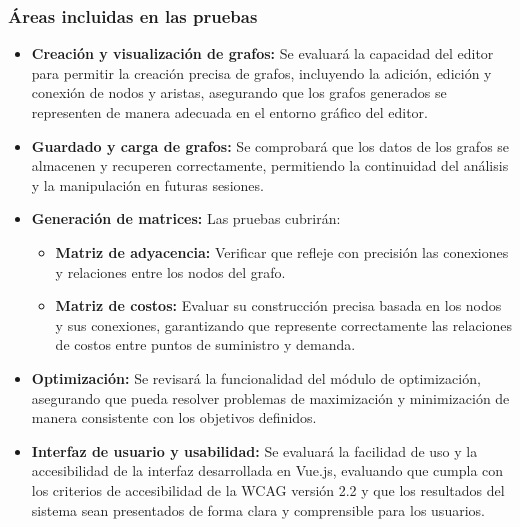 \documentclass[stu, 12pt, letterpaper, donotrepeattitle, floatsintext, natbib]{apa7}
\begin{document}
\subsubsection{Áreas incluidas en las pruebas}

\begin{itemize}
    \item \textbf{Creación y visualización de grafos:} Se evaluará la capacidad del editor para permitir la creación precisa de grafos, incluyendo la adición, edición y conexión de nodos y aristas, asegurando que los grafos generados se representen de manera adecuada en el entorno gráfico del editor.
    
    \item \textbf{Guardado y carga de grafos:} Se comprobará que los datos de los grafos se almacenen y recuperen correctamente, permitiendo la continuidad del análisis y la manipulación en futuras sesiones.

    \item \textbf{Generación de matrices:} Las pruebas cubrirán:
    \begin{itemize}
        \item \textbf{Matriz de adyacencia:} Verificar que refleje con precisión las conexiones y relaciones entre los nodos del grafo.
        \item \textbf{Matriz de costos:} Evaluar su construcción precisa basada en los nodos y sus conexiones, garantizando que represente correctamente las relaciones de costos entre puntos de suministro y demanda.
    \end{itemize}

    \item \textbf{Optimización:} Se revisará la funcionalidad del módulo de optimización, asegurando que pueda resolver problemas de maximización y minimización de manera consistente con los objetivos definidos.

    \item \textbf{Interfaz de usuario y usabilidad:} Se evaluará la facilidad de uso y la accesibilidad de la interfaz desarrollada en Vue.js, evaluando que cumpla con los criterios de accesibilidad de la WCAG versión 2.2 y que los resultados del sistema sean presentados de forma clara y comprensible para los usuarios.


\end{itemize}
\end{document}
